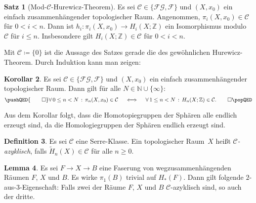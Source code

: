 \documentclass[11pt, a4paper, german]{article}
\theoremstyle{definition}
\newtheorem{lem}{Lemma}
\newtheorem{satz}[lem]{Satz}
\newtheorem{defn}[lem]{Definition}
\newtheorem{kor}[lem]{Korollar}
\theoremstyle{remark}
\newcommand{\N}{\mathbb{N}} %
\newcommand{\Z}{\mathbb{Z}} %
\newcommand{\fa}[1]{\forall \, {#1} \,:\,}
\newcommand{\SC}{\mathcal{C}} %
\newcommand{\FG}{\mathcal{FG}} %
\newcommand{\F}{\mathcal{F}} %
\begin{document}
\begin{satz}[Mod-$\SC$-Hurewicz-Theorem]\label{hurewicz-mod-c}
  Es sei $\SC \in \{ \FG, \F \}$ und
  $(X, x_0)$ ein einfach zusammenhängender topologischer Raum.
  Angenommen, $\pi_i(X, x_0) \in \SC$ für $0 < i < n$.
  Dann ist $h_i : \pi_i(X, x_0) \to H_i(X; \Z)$ ein Isomorphismus modulo $\SC$ für $i \leq n$.
  Insbesondere gilt $H_i(X; \Z) \in \SC$ für $0 < i < n$.
\end{satz}

Mit $\SC \coloneqq \{ 0 \}$ ist die Aussage des Satzes gerade die des gewöhnlichen Hurewicz-Theorem.
Durch Induktion kann man zeigen:

\begin{kor}\label{homotopy-in-c-iff-homology-in-c}
  Es sei $\SC \in \{ \FG, \F \}$ und
  $(X, x_0)$ ein einfach zusammenhängender topologischer Raum.
  Dann gilt für alle $N \in \N \cup \{ \infty \}$:
  \[
    \pushQED{\qed} 
    \fa{0 \leq n < N} \pi_n(X, x_0) \in \SC
    \quad \iff \quad
    \fa{1 \leq n < N} H_n(X; \Z) \in \SC.
    \qedhere
    \popQED
  \]
\end{kor}

Aus dem Korollar folgt, dass die Homotopiegruppen der Sphären alle endlich erzeugt sind, da die Homologiegruppen der Sphären endlich erzeugt sind.

\begin{defn}
  Es sei $\SC$ eine Serre-Klasse.
  Ein topologischer Raum~$X$ heißt \emph{$\SC$-azyklisch}, falls $\widetilde{H}_n(X) \in \SC$ für alle $n \geq 0$.
\end{defn}

\begin{lem}\label{two-of-three}
  Es sei $F \to X \to B$ eine Faserung von wegzusammenhängenden Räumen $F$, $X$ und $B$.
  Es wirke $\pi_1(B)$ trivial auf $H_*(F)$.
  Dann gilt folgende $2$-aus-$3$-Eigenschaft: Falls zwei der Räume $F$, $X$ und $B$ $\SC$-azyklisch sind, so auch der dritte.
\end{lem}
\end{document}

